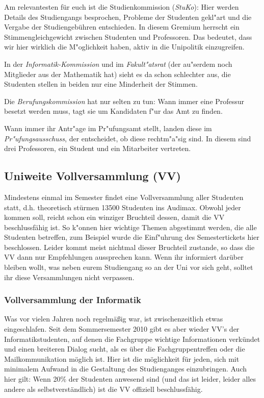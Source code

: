 \begin{multicols}{2}
		Am relevantesten für euch ist die Studienkommission (\emph{StuKo}): Hier werden Details des Studiengangs besprochen, Probleme der Studenten gekl"art und die Vergabe der Studiengebühren entschieden. In diesem Gremium herrscht ein Stimmengleichgewicht zwischen Studenten und Professoren. Das bedeutet, dass wir hier wirklich die M"oglichkeit haben, aktiv in die Unipolitik einzugreifen.

		In der \emph{Informatik-Kommission} und im \emph{Fakult"atsrat} (der au"serdem noch Mitglieder aus der Mathematik hat) sieht es da schon schlechter aus, die Studenten stellen in beiden nur eine Minderheit der Stimmen.

		Die \emph{Berufungskommission} hat nur selten zu tun: Wann immer eine Professur besetzt werden muss, tagt sie um Kandidaten f"ur das Amt zu finden.

		Wann immer ihr Antr"age im Pr"ufungsamt stellt, landen diese im \emph{Pr"ufungsausschuss}, der entscheidet, ob diese rechtm"a"sig sind. In diesem sind drei Professoren, ein Student und ein Mitarbeiter vertreten.

	\subsection*{Uniweite Vollversammlung (VV)}
		Mindestens einmal im Semester findet eine Vollversammlung aller Studenten statt, d.h. theoretisch stürmen 13500 Studenten ins Audimax. Obwohl jeder kommen soll, reicht schon ein winziger Bruchteil dessen, damit die VV beschlussfähig ist. So k"onnen hier wichtige Themen abgestimmt werden, die alle Studenten betreffen, zum Beispiel wurde die Einf"uhrung des Semestertickets hier beschlossen. Leider kommt meist nichtmal dieser Bruchteil zustande, so dass die VV dann nur Empfehlungen aussprechen kann. Wenn ihr informiert darüber bleiben wollt, was neben eurem Studiengang so an der Uni vor sich geht, solltet ihr diese Versammlungen nicht verpassen.

		\subsubsection*{Vollversammlung der Informatik}
			Was vor vielen Jahren noch regelmäßig war, ist zwischenzeitlich etwas eingeschlafen. Seit dem Sommersemester 2010 gibt es aber wieder VV's der Informatikstudenten, auf denen die Fachgruppe wichtige Informationen verkündet und einen breiteren Dialog sucht, als es über die Fachgruppentreffen oder die Mailkommunikation möglich ist. Hier ist die möglichkeit für jeden, sich mit minimalem Aufwand in die Gestaltung des Studienganges einzubringen. Auch hier gilt: Wenn 20\% der Studenten anwesend sind (und das ist leider, leider alles andere als selbstverständlich) ist die VV offiziell beschlussfähig.
\end{multicols}
